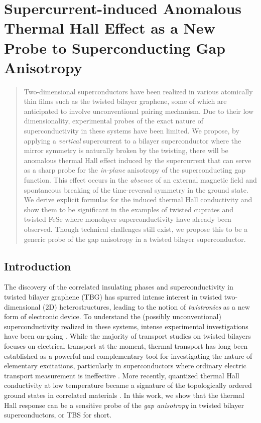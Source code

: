 \chapter{Supercurrent-induced Anomalous Thermal Hall Effect as a New Probe to Superconducting Gap Anisotropy}

\begin{abstract}
    Two-dimensional superconductors have been realized in various atomically thin films such as the twisted bilayer graphene, some of which are anticipated to involve unconventional pairing mechanism. Due to their low dimensionality, experimental probes of the exact nature of superconductivity in these systems have been limited. We propose, by applying a \emph{vertical} supercurrent to a bilayer superconductor where the mirror symmetry is naturally broken by the twisting, there will be anomalous thermal Hall effect induced by the supercurrent that can serve as a sharp probe for the \emph{in-plane} anisotropy of the superconducting gap function. This effect occurs in the \emph{absence} of an external magnetic field and spontaneous breaking of the time-reversal symmetry in the ground state. We derive explicit formulas for the induced thermal Hall conductivity and show them to be significant in the examples of twisted cuprates and twisted FeSe where monolayer superconductivity have already been observed. Though technical challenges still exist, we propose this to be a generic probe of the gap anisotropy in a twisted bilayer superconductor.
\end{abstract}

\section{Introduction}
The discovery of the correlated insulating phases and superconductivity in twisted bilayer graphene (TBG) \cite{cao2018unconventional,cao2018correlated} has spurred intense interest in twisted two-dimensional (2D) heterostructures, leading to the notion of \emph{twistronics} as a new form of electronic device. To understand the (possibly unconventional) superconductivity realized in these systems, intense experimental investigations have been on-going \cite{oh2021evidence,kim2022evidence,lake2022pairing}. While the majority of transport studies on twisted bilayers focuses on electrical transport at the moment, thermal transport has long been established as a powerful and complementary tool for investigating the nature of elementary excitations, particularly in superconductors where ordinary electric transport measurement is ineffective \cite{krishana1997plateaus,chiao2000low,sutherland2003thermal,durst2003weak,zhang2001giant,cvetkovic2015berry}. More recently, quantized thermal Hall conductivity at low temperature became a signature of the topologically ordered ground states in correlated materials \cite{banerjee2018observation,yokoi2021half}. In this work, we show that the thermal Hall response can be a sensitive probe of the {\it gap anisotropy} in twisted bilayer superconductors, or TBS for short. 

